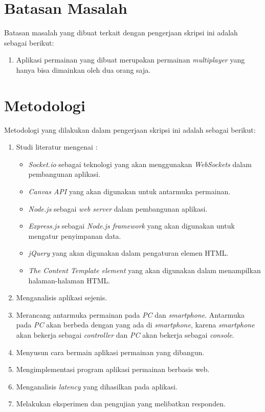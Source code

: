 \section{Batasan Masalah}
\label{sec:batasan}

Batasan masalah yang dibuat terkait dengan pengerjaan skripsi ini adalah sebagai berikut:

\begin{enumerate}
	\item Aplikasi permainan yang dibuat merupakan permainan \textit{multiplayer} yang hanya bisa dimainkan oleh dua orang saja.
\end{enumerate}


\section{Metodologi}
\label{sec:metlit}
Metodologi yang dilakukan dalam pengerjaan skripsi ini adalah sebagai berikut:

\begin{enumerate}
	\item Studi literatur mengenai :
		\begin{itemize}
			\item \textit{Socket.io} sebagai teknologi yang akan menggunakan \textit{WebSockets} dalam pembangunan aplikasi.
			\item \textit{Canvas API} yang akan digunakan untuk antarmuka permainan.
			\item \textit{Node.js} sebagai \textit{web server} dalam pembangunan aplikasi. 	
			\item \textit{Express.js} sebagai \textit{Node.js framework} yang akan digunakan untuk mengatur penyimpanan data.
			\item \textit{jQuery} yang akan digunakan dalam pengaturan elemen HTML.
			\item \textit{The Content Template element} yang akan digunakan dalam menampilkan halaman-halaman HTML.
		\end{itemize}
	\item Menganalisis aplikasi sejenis.
	\item Merancang antarmuka permainan pada \textit{PC} dan \textit{smartphone}. Antarmuka pada \textit{PC} akan berbeda dengan yang ada di \textit{smartphone}, karena \textit{smartphone} akan bekerja sebagai \textit{controller} dan \textit{PC} akan bekerja sebagai \textit{console}.
	\item Menyusun cara bermain aplikasi permainan yang dibangun.
	\item Mengimplementasi program aplikasi permainan berbasis web.
	\item Menganalisis \textit{latency} yang dihasilkan pada aplikasi.
	\item Melakukan eksperimen dan pengujian yang melibatkan responden.
\end{enumerate}

